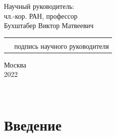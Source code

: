 \documentclass[14pt, dvipsnames, twoside]{extarticle}
\theoremstyle{definition}
\theoremstyle{remark}
\begin{document}
\begin{flushright}
Научный руководитель: \\
чл.-кор. РАН, профессор  \\
Бухштабер Виктор Матвеевич \\
\hfill\break

\begin{tabular}{@{}P{.1in}P{3in}@{}}
& \hrulefill \\
& {\centering подпись научного руководителя}
\end{tabular}

\end{flushright}




\vspace*{\fill}

\begin{center}
Москва \\
2022
\end{center}


 
\clearpage
~
\thispagestyle{empty}
\clearpage
     
\newpage





















\thispagestyle{empty}



\tableofcontents

\thispagestyle{empty}

\newpage

















\fancyhf{}

\rhead{\thepage}



\section{Введение}\label{Introduction}
\end{document}

